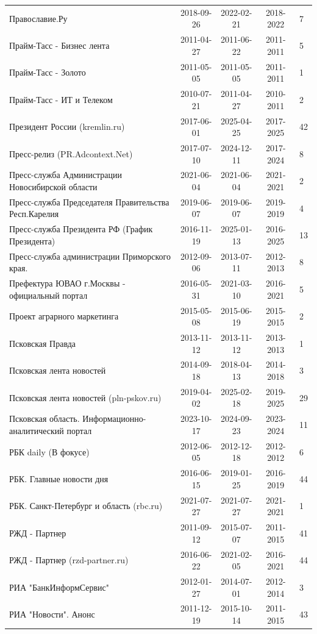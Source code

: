 \begin{longtable}{p{6cm}cccp{2cm}}
Православие.Ру & 2018-09-26 & 2022-02-21 & 2018-2022 & 7\\
Прайм-Тасс - Бизнес лента & 2011-04-27 & 2011-06-22 & 2011-2011 & 5\\
Прайм-Тасс - Золото & 2011-05-05 & 2011-05-05 & 2011-2011 & 1\\
Прайм-Тасс - ИТ и Телеком & 2010-07-21 & 2011-04-27 & 2010-2011 & 2\\
Президент России (kremlin.ru) & 2017-06-01 & 2025-04-25 & 2017-2025 & 42\\
Пресс-релиз (PR.Adcontext.Net) & 2017-07-10 & 2024-12-11 & 2017-2024 & 8\\
Пресс-служба Администрации Новосибирской области & 2021-06-04 & 2021-06-04 & 2021-2021 & 2\\
Пресс-служба Председателя Правительства Респ.Карелия & 2019-06-07 & 2019-06-07 & 2019-2019 & 4\\
Пресс-служба Президента РФ (График Президента) & 2016-11-19 & 2025-01-13 & 2016-2025 & 13\\
Пресс-служба администрации Приморского края. & 2012-09-06 & 2013-07-11 & 2012-2013 & 8\\
Префектура ЮВАО г.Москвы - официальный портал & 2016-05-31 & 2021-03-10 & 2016-2021 & 5\\
Проект аграрного маркетинга & 2015-05-08 & 2015-06-19 & 2015-2015 & 2\\
Псковская Правда & 2013-11-12 & 2013-11-12 & 2013-2013 & 1\\
Псковская лента новостей & 2014-09-18 & 2018-04-13 & 2014-2018 & 3\\
Псковская лента новостей (pln-pskov.ru) & 2019-04-02 & 2025-02-18 & 2019-2025 & 29\\
Псковская область. Информационно-аналитический портал & 2023-10-17 & 2024-09-23 & 2023-2024 & 11\\
РБК daily (В фокусе) & 2012-06-05 & 2012-12-18 & 2012-2012 & 6\\
РБК. Главные новости дня & 2016-06-15 & 2019-01-25 & 2016-2019 & 44\\
РБК. Санкт-Петербург и область (rbc.ru) & 2021-07-27 & 2021-07-27 & 2021-2021 & 1\\
РЖД - Партнер & 2011-09-12 & 2015-07-07 & 2011-2015 & 41\\
РЖД - Партнер (rzd-partner.ru) & 2016-06-22 & 2021-02-05 & 2016-2021 & 44\\
РИА "БанкИнформСервис" & 2012-01-27 & 2014-07-01 & 2012-2014 & 3\\
РИА "Новости". Анонс & 2011-12-19 & 2015-10-14 & 2011-2015 & 43\\

\end{longtable}
